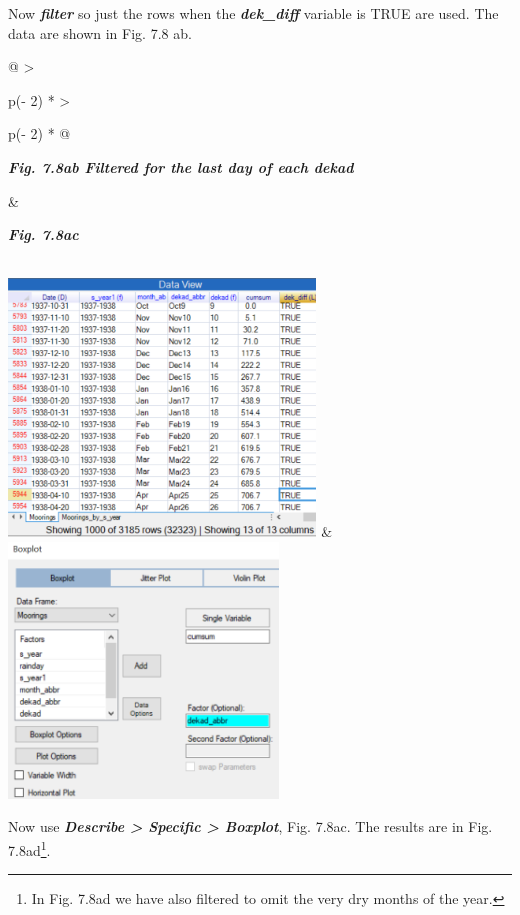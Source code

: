 \documentclass[
  letterpaper,
  DIV=11,
  numbers=noendperiod]{scrreprt}
\begin{document}
Now \textbf{\emph{filter}} so just the rows when the
\textbf{\emph{dek\_diff}} variable is TRUE are used. The data are shown
in Fig. 7.8 ab.

\begin{longtable}[]{@{}
  >{\raggedright\arraybackslash}p{(\columnwidth - 2\tabcolsep) * }
  >{\raggedright\arraybackslash}p{(\columnwidth - 2\tabcolsep) * }@{}}
\toprule\noalign{}
\begin{minipage}[b]{\linewidth}\raggedright
\textbf{\emph{Fig. 7.8ab Filtered for the last day of each dekad}}
\end{minipage} & \begin{minipage}[b]{\linewidth}\raggedright
\textbf{\emph{Fig. 7.8ac}}
\end{minipage} \\
\midrule\noalign{}
\endhead
\bottomrule\noalign{}
\endlastfoot
\includegraphics[width=3.21329in,height=2.69555in]{figures/Fig7.8ab.png}
&
\includegraphics[width=2.82365in,height=2.6776in]{figures/Fig7.8ac.png} \\
\end{longtable}

Now use \textbf{\emph{Describe \textgreater{} Specific \textgreater{}
Boxplot}}, Fig. 7.8ac. The results are in Fig. 7.8ad\footnote{In Fig.
  7.8ad we have also filtered to omit the very dry months of the year.}.
\end{document}
